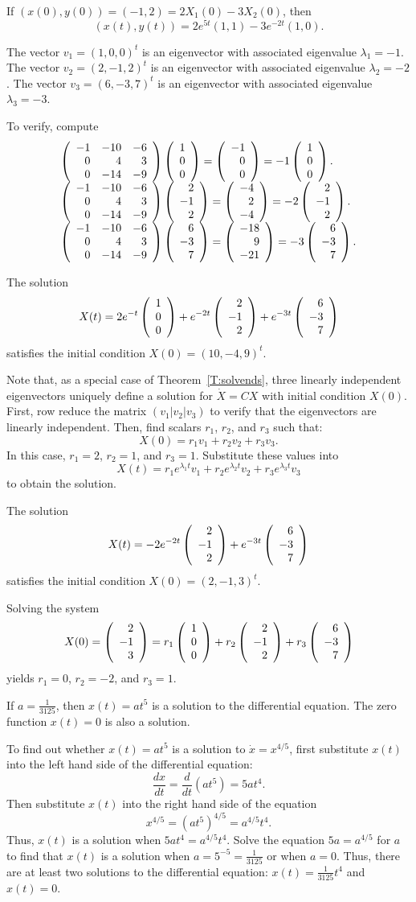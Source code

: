  If $(x(0),y(0)) = (-1,2) = 2X_1(0) - 3X_2(0)$, then
\[
(x(t),y(t)) = 2e^{5t}(1,1) - 3e^{-2t}(1,0).
\]

\ans The vector $v_1 = (1,0,0)^t$ is an eigenvector with associated
eigenvalue $\lambda_1 = -1$.  The vector $v_2 = (2,-1,2)^t$ is an
eigenvector with associated eigenvalue $\lambda_2 = -2$.  The vector
$v_3 = (6,-3,7)^t$ is an eigenvector with associated eigenvalue
$\lambda_3 = -3$.

\soln To verify, compute
\[
\begin{array}{l}
\left(\begin{array}{rrr} -1 & -10 & -6 \\ 0 & 4 & 3 \\ 0 & -14 & -9\end{array}\right)\left(\begin{array}{r} 1 \\ 0 \\ 0\end{array}\right) =
\left(\begin{array}{r} -1 \\ 0 \\ 0\end{array}\right) = -1\left(\begin{array}{r} 1 \\ 0 \\ 0\end{array}\right). \\
\left(\begin{array}{rrr} -1 & -10 & -6 \\ 0 & 4 & 3 \\ 0 & -14 & -9\end{array}\right)\left(\begin{array}{r} 2 \\ -1 \\ 2\end{array}\right) =
\left(\begin{array}{r} -4 \\ 2 \\ -4\end{array}\right) = -2\left(\begin{array}{r} 2 \\ -1 \\ 2\end{array}\right). \\
\left(\begin{array}{rrr} -1 & -10 & -6 \\ 0 & 4 & 3 \\ 0 & -14 & -9\end{array}\right)\left(\begin{array}{r} 6 \\ -3 \\ 7\end{array}\right) =
\left(\begin{array}{r} -18 \\ 9 \\ -21\end{array}\right) = -3\left(\begin{array}{r} 6 \\ -3 \\ 7\end{array}\right).
\end{array}
\]

 \ans The solution
\[
X(t) = 2e^{-t}\left(\begin{array}{r} 1 \\ 0 \\ 0\end{array}\right) + e^{-2t}\left(\begin{array}{r} 2 \\ -1 \\ 2\end{array}\right)
+ e^{-3t}\left(\begin{array}{r} 6 \\ -3 \\ 7\end{array}\right)
\]
satisfies the initial condition $X(0) = (10,-4,9)^t$.


\soln Note that, as a special case of Theorem~\ref{T:solvends}, three
linearly independent eigenvectors
uniquely define a solution for $\dot{X} = CX$ with initial condition
$X(0)$.  First, row reduce the matrix $(v_1|v_2|v_3)$ to verify that
the eigenvectors are linearly independent.  Then, find scalars $r_1$,
$r_2$, and $r_3$ such that:
\[
X(0) = r_1v_1 + r_2v_2 + r_3v_3.
\]
In this case, $r_1 = 2$, $r_2 = 1$, and $r_3 = 1$.  Substitute these
values into
\[
X(t) = r_1e^{\lambda_1t}v_1 + r_2e^{\lambda_2t}v_2 +
r_3e^{\lambda_3t}v_3
\]
to obtain the solution.

 \ans The solution
\[
X(t) = -2e^{-2t}\left(\begin{array}{r} 2 \\ -1 \\ 2\end{array}\right) + e^{-3t}\left(\begin{array}{r} 6 \\ -3 \\ 7\end{array}\right)
\]
satisfies the initial condition $X(0) = (2,-1,3)^t$.

\soln Solving the system
\[
X(0) = \left(\begin{array}{r} 2 \\ -1 \\ 3\end{array}\right) = r_1\left(\begin{array}{r} 1 \\ 0 \\ 0\end{array}\right) +
r_2\left(\begin{array}{r} 2 \\ -1 \\ 2\end{array}\right) + r_3\left(\begin{array}{r} 6 \\ -3 \\ 7\end{array}\right)
\]
yields $r_1 = 0$, $r_2 = -2$, and $r_3 = 1$.

 \ans If $a = \frac{1}{3125}$, then $x(t) = at^5$ is a solution
to the differential equation.  The zero function $x(t) = 0$ is also a
solution.

\soln To find out whether $x(t) = at^5$ is a solution to
$\dot{x} = x^{4/5}$, first substitute $x(t)$ into the left hand side of
the differential equation:
\[
\frac{dx}{dt} = \frac{d}{dt}(at^5) = 5at^4.
\]
Then substitute $x(t)$ into the right hand side of the equation
\[
x^{4/5} = (at^5)^{4/5} = a^{4/5}t^4.
\]
Thus, $x(t)$ is a solution when $5at^4 = a^{4/5}t^4$.  Solve the equation
$5a = a^{4/5}$ for $a$ to find that $x(t)$ is a solution when $a = 5^{-5}
= \frac{1}{3125}$ or when $a = 0$.  Thus, there are at least two solutions
to the differential equation: $x(t) = \frac{1}{3125}t^4$ and $x(t) = 0$.


